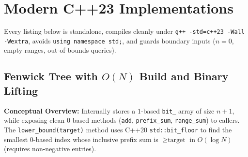 \documentclass[11pt,a4paper]{article}
\theoremstyle{definition}
\begin{document}
\section{Modern C++23 Implementations}

Every listing below is standalone, compiles cleanly under \texttt{g++ -std=c++23 -Wall -Wextra}, avoids \texttt{using namespace std;}, and guards boundary inputs ($n = 0$, empty ranges, out-of-bounds queries).

\subsection{Fenwick Tree with \texorpdfstring{$O(N)$}{O(N)} Build and Binary Lifting}

\textbf{Conceptual Overview:} Internally stores a $1$-based \texttt{bit\_} array of size $n + 1$, while exposing clean $0$-based methods (\texttt{add}, \texttt{prefix\_sum}, \texttt{range\_sum}) to callers. The \texttt{lower\_bound(target)} method uses C++20 \texttt{std::bit\_floor} to find the smallest $0$-based index whose inclusive prefix sum is $\ge \text{target}$ in $O(\log N)$ (requires non-negative entries).
\end{document}
